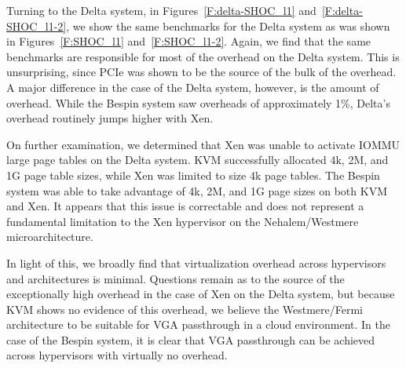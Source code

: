 
Turning to the Delta system, in Figures~\ref{F:delta-SHOC_l1}
and~\ref{F:delta-SHOC_l1-2}, we show the same benchmarks for the Delta system as
was shown in Figures~\ref{F:SHOC_l1} and~\ref{F:SHOC_l1-2}.  Again, we find that the
same benchmarks are responsible for most of the overhead on the Delta system.  This is
unsurprising, since PCIe was shown to be the source of the bulk of the overhead.
A major difference in the case of the Delta system, however, is the amount of
overhead.  While the Bespin system saw overheads of approximately 1\%, Delta's overhead
routinely jumps higher with Xen.%

On further examination, we determined that Xen was unable to activate
IOMMU large page tables on the Delta system.  KVM successfully allocated 4k, 2M,
and 1G page table sizes, while Xen was limited to size 4k page tables.  The
Bespin system was able to take advantage of 4k, 2M, and 1G page sizes on both
KVM and Xen.  It appears that this issue is correctable and does not represent a
fundamental limitation to the Xen hypervisor on the Nehalem/Westmere
microarchitecture.  %



In light of this, we broadly find that virtualization overhead across
hypervisors and architectures is minimal.  Questions remain as to the source of the
exceptionally high overhead in the case of Xen on the Delta
system, but because KVM shows no evidence of this overhead, we believe the
Westmere/Fermi architecture to be suitable for VGA passthrough in a cloud
environment.  In the case of the Bespin system, it is clear that VGA passthrough can be
achieved across hypervisors with virtually no overhead.  

